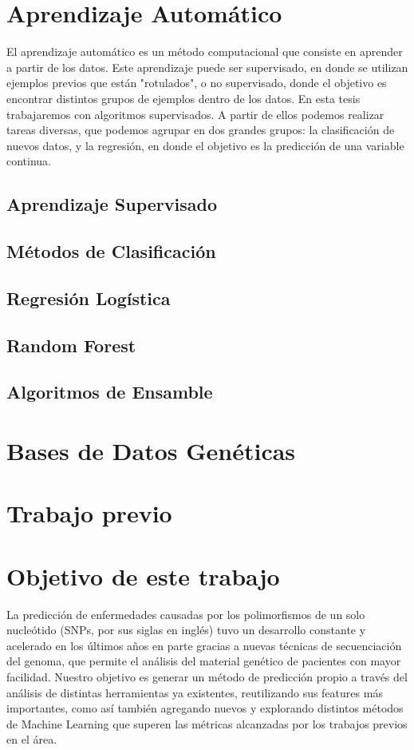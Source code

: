 \section{Aprendizaje Automático}

El aprendizaje automático es un método computacional que consiste en aprender a partir de los datos. Este aprendizaje puede ser supervisado, en donde se utilizan ejemplos previos que están "rotulados", o no supervisado, donde el objetivo es encontrar distintos grupos de ejemplos dentro de los datos. En esta tesis trabajaremos con algoritmos supervisados. A partir de ellos podemos realizar tareas diversas, que podemos agrupar en dos grandes grupos: la clasificación de nuevos datos, y la regresión, en donde el objetivo es la predicción de una variable continua. 

\subsection{Aprendizaje Supervisado}

\subsection{Métodos de Clasificación}

\subsection{Regresión Logística}
\subsection{Random Forest}

\subsection{Algoritmos de Ensamble}

\section{Bases de Datos Genéticas}

\section{Trabajo previo}

\section{Objetivo de este trabajo}

La predicción de enfermedades causadas por los polimorfismos de un solo nucleótido (SNPs, por sus siglas en inglés) tuvo un desarrollo constante y acelerado en los últimos años en parte gracias a nuevas técnicas de secuenciación del genoma, que permite el análisis del material genético de pacientes con mayor facilidad. Nuestro objetivo es generar un método de predicción propio a través del análisis de distintas herramientas ya existentes, reutilizando sus features más importantes, como así también agregando nuevos y explorando distintos métodos de Machine Learning que superen las métricas alcanzadas por los trabajos previos en el área.


